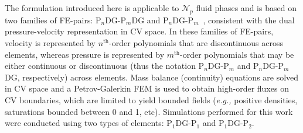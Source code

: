 \documentclass[preprint,authoryear,12pt]{elsarticle}
\newcommand{\PN}[2][error]{P$_{#1}$DG-P$_{#2}$}
\newcommand{\PNDG}[2][error]{P$_{#1}$DG-P$_{#2}$DG}
\newcommand{\eg}{{\it e.g., }}
\begin{document}






\medskip
The formulation introduced here is applicable to $\mathcal{N}_{p}$ fluid phases and is based on two families of FE-pairs: \PNDG[n]{m} and \PN[n]{m}~\citep{cotter_2009a}, consistent with the dual pressure-velocity representation in CV space. In these families of FE-pairs, velocity is represented by $n^{\text{th}}$-order polynomials that are discontinuous across elements, whereas pressure is represented by $m^{\text{th}}$-order polynomials that may be either continuous or discontinuous (thus the notation \PN[n]{m} and \PNDG[n]{m}, respectively) across elements. Mass balance (continuity) equations are solved in CV space and a Petrov-Galerkin FEM is used to obtain high-order fluxes on CV boundaries, which are limited to yield bounded fields (\eg positive densities, saturations bounded between 0 and 1, etc). Simulations performed for this work were conducted using two types of elements: \PN[1]{1} and \PN[1]{2}.
\end{document}
